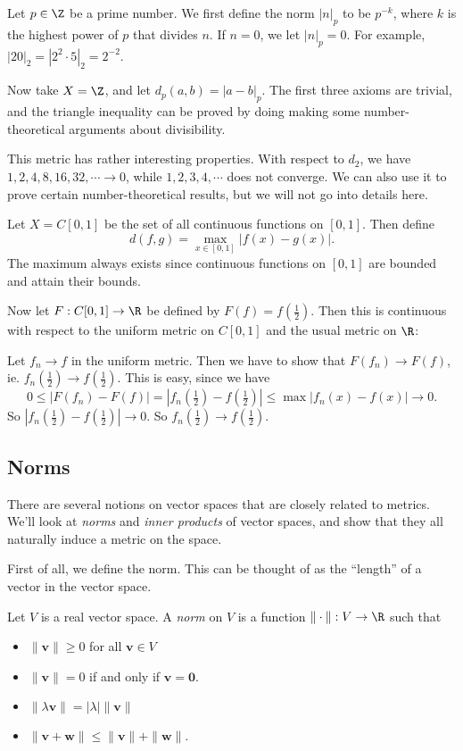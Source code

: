 \documentclass[a4paper]{article}
\begin{document}
\begin{eg}
  Let $p\in \Z$ be a prime number. We first define the norm $|n|_p$ to be $p^{-k}$, where $k$ is the highest power of $p$ that divides $n$. If $n = 0$, we let $|n|_p = 0$. For example, $|20|_2 = |2^2\cdot 5|_2 = 2^{-2}$.

  Now take $X = \Z$, and let $d_p (a, b) = |a - b|_p$. The first three axioms are trivial, and the triangle inequality can be proved by doing making some number-theoretical arguments about divisibility.

  This metric has rather interesting properties. With respect to $d_2$, we have $1, 2, 4, 8, 16, 32, \cdots \to 0$, while $1, 2, 3, 4, \cdots$ does not converge. We can also use it to prove certain number-theoretical results, but we will not go into details here.
\end{eg}

\begin{eg}
  Let $X = C[0, 1]$ be the set of all continuous functions on $[0, 1]$. Then define
  \[
    d(f, g) = \max_{x\in [0, 1]}|f(x) - g(x)|.
  \]
  The maximum always exists since continuous functions on $[0, 1]$ are bounded and attain their bounds.

  Now let $F: C[0, 1] \to \R$ be defined by $F(f) = f(\frac{1}{2})$. Then this is continuous with respect to the uniform metric on $C[0, 1]$ and the usual metric on $\R$:

  Let $f_n \to f$ in the uniform metric. Then we have to show that $F(f_n) \to F(f)$, ie. $f_n(\frac{1}{2}) \to f(\frac{1}{2})$. This is easy, since we have
  \[
    0 \leq |F(f_n) - F(f)| = |f_n(\tfrac{1}{2}) - f(\tfrac{1}{2})| \leq \max|f_n(x) - f(x)| \to 0.
  \]
  So $|f_n(\frac{1}{2}) - f(\frac{1}{2})| \to 0$. So $f_n(\frac{1}{2}) \to f(\frac{1}{2})$.
\end{eg}

\subsection{Norms}
There are several notions on vector spaces that are closely related to metrics. We'll look at \emph{norms} and \emph{inner products} of vector spaces, and show that they all naturally induce a metric on the space.

First of all, we define the norm. This can be thought of as the ``length'' of a vector in the vector space.
\begin{defi}[Norm]
  Let $V$ is a real vector space. A \emph{norm} on $V$ is a function $\|\cdot \|: V\to \R$ such that
  \begin{itemize}
    \item $\|\mathbf{v}\| \geq 0$ for all $\mathbf{v}\in V$
    \item $\|\mathbf{v}\| = 0$ if and only if $\mathbf{v} = \mathbf{0}$.
    \item $\|\lambda \mathbf{v}\| = |\lambda|\|\mathbf{v}\|$
    \item $\|\mathbf{v} + \mathbf{w}\| \leq \|\mathbf{v}\| + \|\mathbf{w}\|$.
  \end{itemize}
\end{defi}
\end{document}
